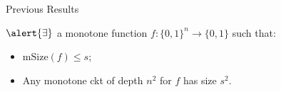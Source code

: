 \begin{frame}{Previous Results}

    \begin{theorem}
        $\alert{\exists}$ a monotone function $f\colon \{0, 1\}^{n} \to \{0, 1\}$ such that:
        \begin{itemize}
            \item $\mathrm{mSize}(f) \le s$;
            \item Any monotone ckt of depth $n^2$ for $f$ has size $s^2$.
        \end{itemize}
    \end{theorem}
\end{frame}